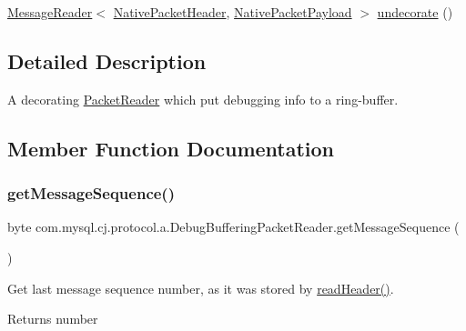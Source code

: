 \begin{DoxyCompactItemize}
\item 
\mbox{\hyperlink{interfacecom_1_1mysql_1_1cj_1_1protocol_1_1_message_reader}{Message\+Reader}}$<$ \mbox{\hyperlink{classcom_1_1mysql_1_1cj_1_1protocol_1_1a_1_1_native_packet_header}{Native\+Packet\+Header}}, \mbox{\hyperlink{classcom_1_1mysql_1_1cj_1_1protocol_1_1a_1_1_native_packet_payload}{Native\+Packet\+Payload}} $>$ \mbox{\hyperlink{classcom_1_1mysql_1_1cj_1_1protocol_1_1a_1_1_debug_buffering_packet_reader_a9e51a1437df97c27971470ee4df5ab83}{undecorate}} ()
\end{DoxyCompactItemize}


\subsection{Detailed Description}
A decorating \mbox{\hyperlink{}{Packet\+Reader}} which put debugging info to a ring-\/buffer. 

\subsection{Member Function Documentation}
\mbox{\label{classcom_1_1mysql_1_1cj_1_1protocol_1_1a_1_1_debug_buffering_packet_reader_a221efd81777e2a3fcceb0368f6baf0db}} 
\subsubsection{\texorpdfstring{get\+Message\+Sequence()}{getMessageSequence()}}
{\footnotesize\ttfamily byte com.\+mysql.\+cj.\+protocol.\+a.\+Debug\+Buffering\+Packet\+Reader.\+get\+Message\+Sequence (\begin{DoxyParamCaption}{ }\end{DoxyParamCaption})}

Get last message sequence number, as it was stored by \mbox{\hyperlink{classcom_1_1mysql_1_1cj_1_1protocol_1_1a_1_1_debug_buffering_packet_reader_a59ead81a6bb0f0b358f9e44db6b63280}{read\+Header()}}.

\begin{DoxyReturn}{Returns}
number 
\end{DoxyReturn}


